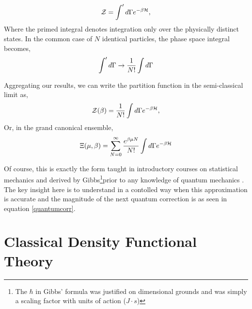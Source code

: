 \begin{equation}
    \mathcal{Z} = \int^\prime d\Gamma e^{-\beta \mathcal{H}},
\end{equation}
Where the primed integral denotes integration only over the physically distinct states. In the common case of $N$ identical particles, the phase space integral becomes, 
\begin{equation}
    \int^\prime d\Gamma \rightarrow \frac{1}{N!}\int d\Gamma
\end{equation}

Aggregating our results, we can write the partition function in the semi-classical limit as,
\begin{equation}
    \mathcal{Z}(\beta) = \frac{1}{N!}\int d\Gamma e^{-\beta \mathcal{H}},
\end{equation}
Or, in the grand canonical ensemble,
\begin{equation}
    \Xi(\mu, \beta) = \sum_{N = 0}^\infty \frac{e^{\beta\mu N}}{N!} \int d\Gamma e^{-\beta \mathcal{H}}
\end{equation}

Of course, this is exactly the form taught in introductory courses on statistical mechanics and derived by Gibbs\footnote{The $\hbar$ in Gibbs' formula was justified on dimensional grounds and was simply a scaling factor with units of action ($J\cdot s$)}prior to any knowledge of quantum mechanics \cite{Gibbs}.
The key insight here is to understand in a contolled way when this approximation is accurate and the magnitude of the next quantum correction is as seen in equation \ref{quantumcorr}.

\section{Classical Density Functional Theory}  %

